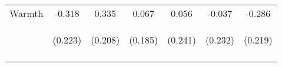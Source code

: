 \begin{tabular}{lcccccc}
\noalign{\smallskip}Warmth & -0.318 & 0.335 & 0.067 & 0.056 & -0.037 & -0.286\\
 & \begin{footnotesize}(0.223)\end{footnotesize} & \begin{footnotesize}(0.208)\end{footnotesize} & \begin{footnotesize}(0.185)\end{footnotesize} & \begin{footnotesize}(0.241)\end{footnotesize} & \begin{footnotesize}(0.232)\end{footnotesize} & \begin{footnotesize}(0.219)\end{footnotesize}\\
\noalign{\smallskip}\hline\end{tabular}\\
